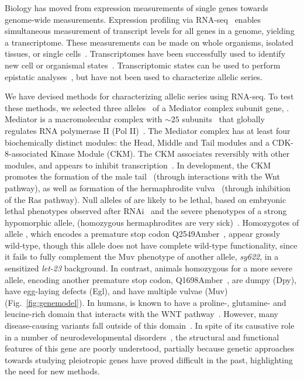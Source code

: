Biology has moved from expression measurements of single genes towards
genome-wide measurements. Expression profiling via RNA-seq~\citep{Mortazavi2008}
enables simultaneous measurement of transcript levels for all genes in a genome,
yielding a transcriptome. These measurements can be made on whole organisms,
isolated tissues, or single cells~\citep{Tang2009,Schwarz2012}. Transcriptomes
have been successfully used to identify new cell or organismal
states~\citep{Angeles-Albores2017,Villani2017}. Transcriptomic states can be
used to perform epistatic analyses~\citep{Dixit2016,AngelesAlboresHIF},
but have not been used to characterize allelic series.

We have devised methods for characterizing allelic series using RNA-seq. To test
these methods, we selected three alleles~\citep{Zhang2000,Moghal2003} of a
\cel{} Mediator complex subunit gene, \dpy{}. Mediator is a macromolecular
complex with $\sim25$ subunits~\citep{Jeronimo2017} that globally regulates RNA
polymerase II (Pol II)~\citep{Allen2015,Takagi2006}. The Mediator complex has at
least four biochemically distinct modules: the Head, Middle and Tail modules and
a CDK-8-associated Kinase Module (CKM). The CKM associates reversibly with other
modules, and appears to inhibit transcription~\citep{Knuesel2009,Elmlund2006}.
In \cel{} development, the CKM promotes the formation of the male
tail~\citep{Zhang2000} (through interactions with the Wnt pathway), as well as
formation of the hermaphrodite vulva~\citep{Moghal2003} (through inhibition of
the Ras pathway). Null alleles of \dpy{} are likely to be lethal, based on
embryonic lethal phenotypes observed after RNAi~\citep{Wang2004,Lehner2006} and
the severe phenotypes of a strong \dpy{} hypomorphic allele, 
(homozygous hermaphrodites are very sick)~\citep{Riddle1997}. Homozygotes of
allele , which encodes a premature stop codon
Q2549Amber~\citep{Zhang2000}, appear grossly wild-type, though this allele does
not have complete wild-type functionality, since it fails to fully complement
the Muv phenotype of another allele, \emph{sy622}, in a sensitized \emph{let-23}
background. In contrast, animals homozygous for a more severe allele,
 encoding another premature stop codon,
Q1698Amber~\citep{Moghal2003}, are dumpy (Dpy), have egg-laying defects (Egl),
and have multiple vulvae (Muv) (Fig.~\ref{fig:genemodel}). In
humans,  is known to have a proline-, glutamine- and leucine-rich
domain that interacts with the WNT pathway~\citep{Kim2006}. However, many
disease-causing variants fall outside of this domain~\citep{Yamamoto2015}.
In spite of its causative role in a number of neurodevelopmental
disorders~\citep{Graham2013}, the structural and functional features of this
gene are poorly understood, partially because genetic approaches towards
studying pleiotropic genes have proved difficult in the past, highlighting the
need for new methods.

